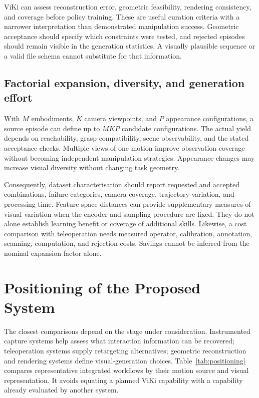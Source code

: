 ViKi can assess reconstruction error, geometric feasibility, rendering
consistency, and coverage before policy training. These are useful curation
criteria with a narrower interpretation than demonstrated manipulation
success. Geometric acceptance should specify which constraints were tested,
and rejected episodes should remain visible in the generation statistics.
A visually plausible sequence or a valid file schema cannot substitute for
that information.

\subsection{Factorial expansion, diversity, and generation effort}

With $M$ embodiments, $K$ camera viewpoints, and $P$ appearance configurations,
a source episode can define up to $M K P$ candidate configurations. The actual
yield depends on reachability, grasp compatibility, scene observability, and
the stated acceptance checks. Multiple views of one motion improve observation
coverage without becoming independent manipulation strategies. Appearance
changes may increase visual diversity without changing task geometry.

Consequently, dataset characterisation should report requested and accepted
combinations, failure categories, camera coverage, trajectory variation, and
processing time. Feature-space distances can provide supplementary measures
of visual variation when the encoder and sampling procedure are fixed. They
do not alone establish learning benefit or coverage of additional skills.
Likewise, a cost comparison with teleoperation needs measured operator,
calibration, annotation, scanning, computation, and rejection costs. Savings
cannot be inferred from the nominal expansion factor alone.

\section{Positioning of the Proposed System}
\label{sec:positioning}

The closest comparisons depend on the stage under consideration. Instrumented
capture systems help assess what interaction information can be recovered;
teleoperation systems supply retargeting alternatives; geometric reconstruction
and rendering systems define visual-generation choices. Table~\ref{tab:positioning}
compares representative integrated workflows by their motion source and visual
representation. It avoids equating a planned ViKi capability with a capability
already evaluated by another system.

